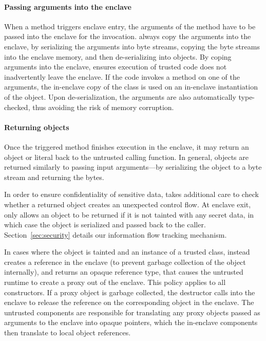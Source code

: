 \paragraph{Passing arguments into the enclave}
When a method triggers enclave entry, the arguments of the method have to be passed into the enclave for the invocation.
\sysname{} always copy the arguments into the enclave,
by serializing the arguments into byte streams,
copying the byte streams into the enclave memory,
and then de-serializing into objects.
By coping arguments into the enclave,
\sysname{} ensures execution of trusted code does not inadvertently leave the enclave.
If the code invokes a method on one of the arguments,
the in-enclave copy of the class is used on an in-enclave instantiation of the object.
Upon de-serialization, the arguments are also automatically type-checked,
thus avoiding the risk of memory corruption.

\paragraph{Returning objects}
Once the triggered method finishes execution in the enclave,
it may return an object or literal back to the untrusted calling function.
In general, objects are returned similarly to passing input arguments---by serializing the object to a byte stream and returning the bytes.

In order to ensure confidentiality of sensitive data, \sysname{} takes additional care to check
whether a returned object creates an unexpected control flow.
At enclave exit, \sysname{} only allows an object to be returned if it is not tainted with any secret data,
in which case the object is serialized and passed back to the caller.
Section~\ref{sec:security} details our information flow tracking mechanism.

In cases where the object is tainted and an instance of a trusted class,
\sysname{} instead creates a reference in the enclave (to prevent garbage collection of the object internally),
and returns an opaque reference type, that causes the untrusted \sysname{} runtime to create a proxy out of the enclave.
This policy applies to all constructors.
If a proxy object is garbage collected, the destructor calls into the enclave to release the reference on the 
corresponding object in the enclave.
The \sysname{} untrusted components are responsible for translating any proxy objects passed as arguments to the enclave into opaque pointers,
which the in-enclave components then translate to local object references.

